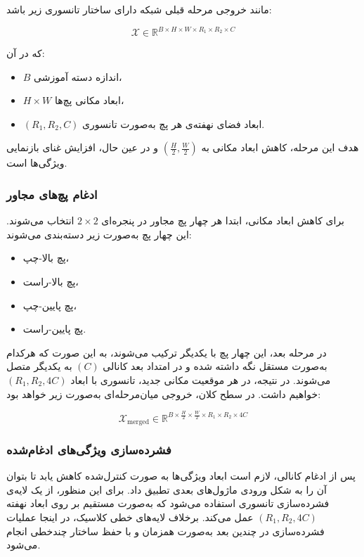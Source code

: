 مانند  خروجی مرحله قبلی شبکه دارای ساختار تانسوری زیر باشد:

\[
\mathcal{X} \in \mathbb{R}^{B \times H \times W \times R_1 \times R_2 \times C}
\]

که در آن:

\begin{itemize}
	\item $B$ اندازه دسته آموزشی،  
	\item $H \times W$ ابعاد مکانی پچ‌ها،  
	\item $(R_1, R_2, C)$ ابعاد فضای نهفته‌ی هر پچ به‌صورت تانسوری.
\end{itemize}

هدف این مرحله، کاهش ابعاد مکانی به $\left( \frac{H}{2}, \frac{W}{2} \right)$ و در عین حال، افزایش غنای بازنمایی ویژگی‌ها است.

\subsubsection*{ادغام پچ‌های مجاور}

برای کاهش ابعاد مکانی، ابتدا هر چهار پچ مجاور در پنجره‌ای $2 \times 2$ انتخاب می‌شوند. این چهار پچ به‌صورت زیر دسته‌بندی می‌شوند:

\begin{itemize}
	\item پچ بالا-چپ،
	\item پچ بالا-راست،
	\item پچ پایین-چپ،
	\item پچ پایین-راست.
\end{itemize}

در مرحله بعد، این چهار پچ با یکدیگر ترکیب می‌شوند، به این صورت که هرکدام به‌صورت مستقل نگه داشته شده و در امتداد بعد کانالی $(C)$ به یکدیگر متصل می‌شوند. در نتیجه، در هر موقعیت مکانی جدید، تانسوری با ابعاد $(R_1, R_2, 4C)$ خواهیم داشت. در سطح کلان، خروجی میان‌مرحله‌ای به‌صورت زیر خواهد بود:

\[
\mathcal{X}_{\text{merged}} \in \mathbb{R}^{B \times \frac{H}{2} \times \frac{W}{2} \times R_1 \times R_2 \times 4C}
\]

\subsubsection*{فشرده‌سازی ویژگی‌های ادغام‌شده}

پس از ادغام کانالی، لازم است ابعاد ویژگی‌ها به صورت کنترل‌شده کاهش یابد تا بتوان آن را به شکل ورودی ماژول‌های بعدی تطبیق داد. برای این منظور، از یک لایه‌ی فشرده‌سازی تانسوری استفاده می‌شود که به‌صورت مستقیم بر روی ابعاد نهفته $(R_1, R_2, 4C)$ عمل می‌کند. برخلاف لایه‌های خطی کلاسیک، در اینجا عملیات فشرده‌سازی در چندین بعد به‌صورت همزمان و با حفظ ساختار چندخطی انجام می‌شود.

